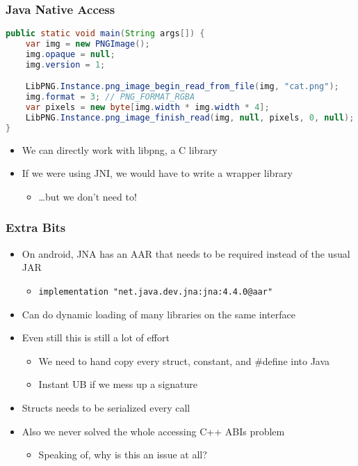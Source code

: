 \documentclass[10pt,mathserif]{beamer}
\begin{document}
	\begin{frame}[fragile]
		\frametitle{Java Native Access}
			\begin{lstlisting}[language=java]
public static void main(String args[]) {
	var img = new PNGImage();
	img.opaque = null;
	img.version = 1;

	LibPNG.Instance.png_image_begin_read_from_file(img, "cat.png");
	img.format = 3; // PNG_FORMAT_RGBA
	var pixels = new byte[img.width * img.width * 4];
	LibPNG.Instance.png_image_finish_read(img, null, pixels, 0, null);
}
		\end{lstlisting}

		\begin{itemize}
			\item We can directly work with libpng, a C library
			\item If we were using JNI, we would have to write a wrapper library
			\begin{itemize}
				\item \dots but we don't need to!
			\end{itemize}
		\end{itemize}
	\end{frame}

	\begin{frame}
		\frametitle{Extra Bits}

		\begin{itemize}
			\item On android, JNA has an AAR that needs to be required instead of the usual JAR
			\begin{itemize}
				\item \lstinline{implementation "net.java.dev.jna:jna:4.4.0@aar"}
			\end{itemize}
			\item Can do dynamic loading of many libraries on the same interface
			\item Even still this is still a lot of effort
			\begin{itemize}
				\item We need to hand copy every struct, constant, and \#define into Java
				\item Instant UB if we mess up a signature
			\end{itemize}
			\item Structs needs to be serialized every call
			\item Also we never solved the whole accessing C++ ABIs problem
			\begin{itemize}
				\item Speaking of, why is this an issue at all?
			\end{itemize}
		\end{itemize}
	\end{frame}
\end{document}
